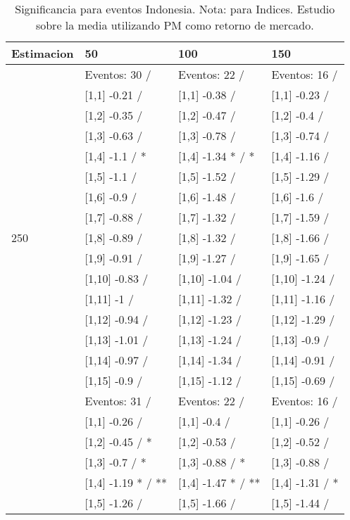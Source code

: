 \begin{table}

\caption{Significancia para eventos Indonesia. Nota: para Indices. Estudio sobre la media utilizando PM como retorno de mercado.}
\centering
\begin{tabular}[t]{llll}
\toprule
Estimacion & 50 & 100 & 150\\
\midrule
 & Eventos:  30 / & Eventos:  22 / & Eventos:  16 /\\
 & {}[1,1] -0.21  / & {}[1,1] -0.38  / & {}[1,1] -0.23  /\\
 & {}[1,2] -0.35  / & {}[1,2] -0.47  / & {}[1,2] -0.4  /\\
 & {}[1,3] -0.63  / & {}[1,3] -0.78  / & {}[1,3] -0.74  /\\
 & {}[1,4] -1.1  / * & {}[1,4] -1.34 * / * & {}[1,4] -1.16  /\\
\addlinespace
 & {}[1,5] -1.1  / & {}[1,5] -1.52  / & {}[1,5] -1.29  /\\
 & {}[1,6] -0.9  / & {}[1,6] -1.48  / & {}[1,6] -1.6  /\\
 & {}[1,7] -0.88  / & {}[1,7] -1.32  / & {}[1,7] -1.59  /\\
250 & {}[1,8] -0.89  / & {}[1,8] -1.32  / & {}[1,8] -1.66  /\\
 & {}[1,9] -0.91  / & {}[1,9] -1.27  / & {}[1,9] -1.65  /\\
\addlinespace
 & {}[1,10] -0.83  / & {}[1,10] -1.04  / & {}[1,10] -1.24  /\\
 & {}[1,11] -1  / & {}[1,11] -1.32  / & {}[1,11] -1.16  /\\
 & {}[1,12] -0.94  / & {}[1,12] -1.23  / & {}[1,12] -1.29  /\\
 & {}[1,13] -1.01  / & {}[1,13] -1.24  / & {}[1,13] -0.9  /\\
 & {}[1,14] -0.97  / & {}[1,14] -1.34  / & {}[1,14] -0.91  /\\
\addlinespace
 & {}[1,15] -0.9  / & {}[1,15] -1.12  / & {}[1,15] -0.69  /\\
 & Eventos:  31 / & Eventos:  22 / & Eventos:  16 /\\
 & {}[1,1] -0.26  / & {}[1,1] -0.4  / & {}[1,1] -0.26  /\\
 & {}[1,2] -0.45  / * & {}[1,2] -0.53  / & {}[1,2] -0.52  /\\
 & {}[1,3] -0.7  / * & {}[1,3] -0.88  / * & {}[1,3] -0.88  /\\
\addlinespace
 & {}[1,4] -1.19 * / ** & {}[1,4] -1.47 * / ** & {}[1,4] -1.31  / *\\
 & {}[1,5] -1.26  / & {}[1,5] -1.66  / & {}[1,5] -1.44  /\\

\end{tabular}
\end{table}
